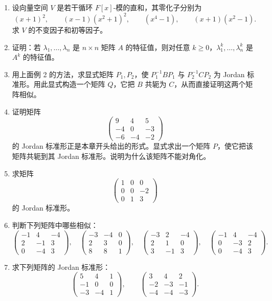 \begin{enumerate}[label=\arabic*.]
\item 设向量空间 $V$ 是若干循环 $F[x]$-模的直和，其零化子分别为
\[
(x+1)^2,
\qquad (x-1)(x^2+1)^2,
\qquad (x^4-1),
\qquad (x+1)(x^2-1).
\]
求 $V$ 的不变因子和初等因子。

\item 证明：若 $\lambda_1,
\ldots,\lambda_n$ 是 $n\times n$ 矩阵 $A$ 的特征值，则对任意 $k\geq0$，$\lambda_1^k,
\ldots,
\lambda_n^k$ 是 $A^k$ 的特征值。

\item 用上面例 2 的方法，求显式矩阵 $P_1,P_2$，使 $P_1^{-1}BP_1$ 与 $P_2^{-1}CP_2$ 为 Jordan 标准形。用此显式构造一个矩阵 $Q$，它把 $B$ 共轭为 $C$，从而直接证明这两个矩阵相似。

\item 证明矩阵
\[
\begin{pmatrix}
9&4&5\\
-4&0&-3\\
-6&-4&-2
\end{pmatrix}
\]
的 Jordan 标准形正是本章开头给出的形式。显式求出一个矩阵 $P$，使它把该矩阵共轭到其 Jordan 标准形。说明为什么该矩阵不能对角化。

\item 求矩阵
\[
\begin{pmatrix}
1&0&0\\
0&0&-2\\
0&1&3
\end{pmatrix}
\]
的 Jordan 标准形。

\item 判断下列矩阵中哪些相似：
\[
\begin{pmatrix}-1&4&-4\\2&-1&3\\0&-4&3\end{pmatrix},\quad
\begin{pmatrix}-3&-4&0\\2&3&0\\8&8&1\end{pmatrix},\quad
\begin{pmatrix}-3&2&-4\\2&1&0\\3&-1&3\end{pmatrix},\quad
\begin{pmatrix}-1&4&-4\\0&-3&2\\0&-4&3\end{pmatrix}.
\]

\item 求下列矩阵的 Jordan 标准形：
\[
\begin{pmatrix}5&4&1\\-1&0&0\\-3&-4&1\end{pmatrix},\qquad
\begin{pmatrix}3&4&2\\-2&-3&-1\\-4&-4&-3\end{pmatrix}.
\]


\end{enumerate}
